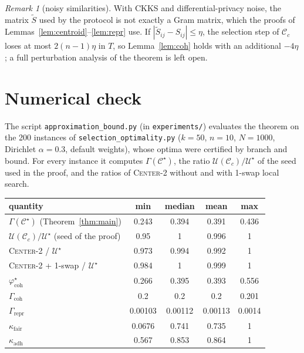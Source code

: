 \documentclass[10pt]{article}
\theoremstyle{remark}
\newtheorem{remark}{Remark}
\theoremstyle{definition}
\newcommand{\coh}{\varphi_{\text{coh}}}
\newcommand{\C}{\mathcal{C}}
\begin{document}
\begin{remark}[noisy similarities]
With CKKS and differential-privacy noise, the matrix $\tilde S$ used by the protocol is not exactly a Gram matrix,
which the proofs of Lemmas~\ref{lem:centroid}--\ref{lem:repr} use. If $|\tilde S_{ij} - S_{ij}| \le \eta$, the
selection step of $\C_c$ loses at most $2(n-1)\eta$ in $T$, so Lemma~\ref{lem:coh} holds with an additional $-4\eta$;
a full perturbation analysis of the theorem is left open.
\end{remark}

\section{Numerical check}

The script \texttt{approximation\_bound.py} (in \texttt{experiments/}) evaluates the theorem on the 200
instances of \texttt{selection\_optimality.py} ($k = 50$, $n = 10$, $N = 1000$, Dirichlet $\alpha = 0.3$, default
weights), whose optima were certified by branch and bound. For every instance it computes $\Gamma(\C^\star)$, the ratio
$\mathcal{U}(\C_c)/\mathcal{U}^\star$ of the seed used in the proof, and the ratios of \textsc{Center-2} without and
with 1-swap local search.

\begin{center}
\begin{tabular}{lcccc}
\toprule
quantity & min & median & mean & max \\
\midrule
$\Gamma(\C^\star)$ (Theorem~\ref{thm:main}) & 0.243 & 0.394 & 0.391 & 0.436 \\
$\mathcal{U}(\C_c)/\mathcal{U}^\star$ (seed of the proof) & 0.95 & 1 & 0.996 & 1 \\
\textsc{Center-2} / $\mathcal{U}^\star$ & 0.973 & 0.994 & 0.992 & 1 \\
\textsc{Center-2} + 1-swap / $\mathcal{U}^\star$ & 0.984 & 1 & 0.999 & 1 \\
$\coh^\star$ & 0.266 & 0.395 & 0.393 & 0.556 \\
$\Gamma_{\text{coh}}$ & 0.2 & 0.2 & 0.2 & 0.201 \\
$\Gamma_{\text{repr}}$ & 0.00103 & 0.00112 & 0.00113 & 0.0014 \\
$\kappa_{\text{fair}}$ & 0.0676 & 0.741 & 0.735 & 1 \\
$\kappa_{\text{adh}}$ & 0.567 & 0.853 & 0.864 & 1 \\
\bottomrule
\end{tabular}
\end{center}
\end{document}
